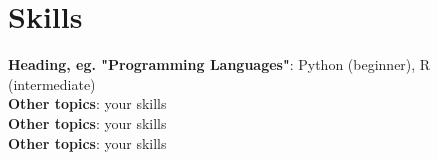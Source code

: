 \documentclass[a4paper,11pt]{article}
\begin{document}
\section{Skills}
\begin{itemize}[leftmargin=0mm, label={}]
  \normalsize{\item{
                \textbf{Heading, eg. "Programming Languages"}{: Python (beginner), R (intermediate)} \\
                \textbf{Other topics}{: your skills}\\
                \textbf{Other topics}{: your skills} \\
                \textbf{Other topics}{: your skills} \\
          }}
\end{itemize}


\end{document}
